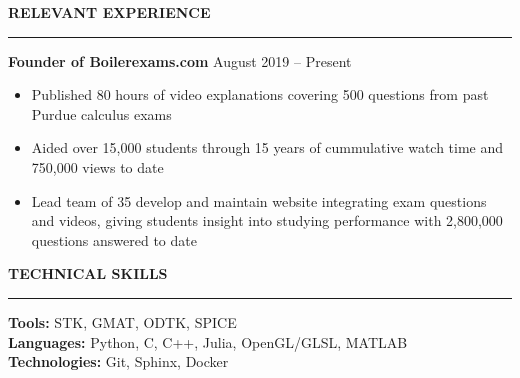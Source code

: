 \documentclass[11pt, a4paper]{article}
\newcommand{\sectiontitle}[1]{{\Large \textbf{#1}}\vspace{0.5em}\hrule\vspace{0.5em}}
\begin{document}
\sectiontitle{RELEVANT EXPERIENCE}
\textbf{Founder of Boilerexams.com} \hfill August 2019 -- Present
\begin{itemize}[noitemsep]
    \item Published 80 hours of video explanations covering 500 questions from past Purdue calculus exams
    \item Aided over 15,000 students through 15 years of cummulative watch time and 750,000 views to date
    \item Lead team of 35 develop and maintain website integrating exam questions and videos, giving students
    insight into studying performance with 2,800,000 questions answered to date
\end{itemize}

\sectiontitle{TECHNICAL SKILLS}
\textbf{Tools:} STK, GMAT, ODTK, SPICE \\
\textbf{Languages:} Python, C, C++, Julia, OpenGL/GLSL, MATLAB \\
\textbf{Technologies:} Git, Sphinx, Docker
\end{document}

